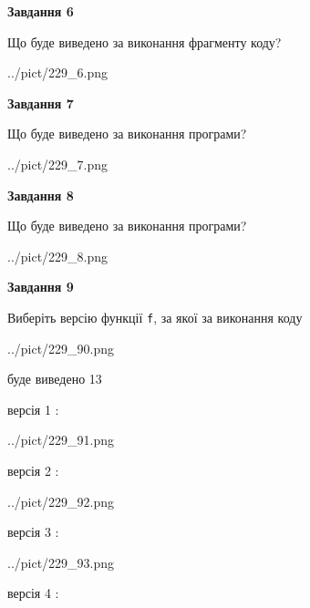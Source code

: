 \documentclass[12pt, ukrainian]{article}
\def\code#1{\Verb!#1!}
\begin{document}
{\begin {large}
{\begin {center}\textbf{Завдання 6}\end {center}}

Що буде виведено за виконання фрагменту коду?\par
\begin{center}
	{../pict/229_6.png}
\end{center}
\newpage

{\begin {center}\textbf{Завдання 7}\end {center}}

Що буде виведено за виконання програми?\par
\begin{center}
	{../pict/229_7.png}
\end{center}
\newpage

{\begin {center}\textbf{Завдання 8}\end {center}}

Що буде виведено за виконання програми?\par
\begin{center}
	{../pict/229_8.png}
\end{center}
\newpage

{\begin {center}\textbf{Завдання 9}\end {center}}

Виберіть версію функції \code{f}, за якої за виконання коду
\begin{center}
	{../pict/229_90.png}
\end{center}
буде виведено 13

\vspace{5mm}
версія 1 :

\begin{center}
	{../pict/229_91.png}
\end{center}
версія 2 :

\begin{center}
	{../pict/229_92.png}
\end{center}
версія 3 :

\begin{center}
	{../pict/229_93.png}
\end{center}
версія 4 :


\end{large}}
\end{document}
